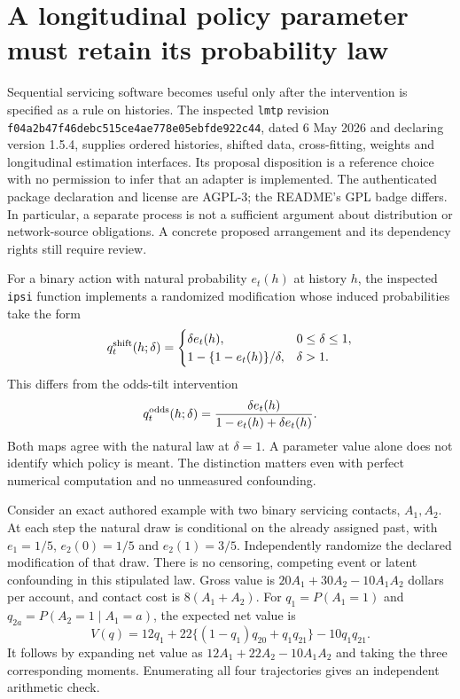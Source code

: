 \section{A longitudinal policy parameter must retain its probability law}
\label{exec23:lmtp-scope}

Sequential servicing software becomes useful only after the intervention is
specified as a rule on histories. The inspected \texttt{lmtp} revision
\texttt{f04a2b47f46debc515ce4ae778e05ebfde922c44}, dated 6 May 2026 and
declaring version 1.5.4, supplies ordered histories, shifted data, cross-fitting,
weights and longitudinal estimation interfaces. Its proposal disposition is a
reference choice with no permission to infer that an adapter is implemented.
The authenticated package declaration and license are AGPL-3; the README's
GPL badge differs. In particular, a separate process is not a sufficient
argument about distribution or network-source obligations. A concrete proposed
arrangement and its dependency rights still require review.
\citep{exec22_lmtp_reuse}

For a binary action with natural probability $e_t(h)$ at history $h$, the
inspected \texttt{ipsi} function implements a randomized modification whose
induced probabilities take the form
\begin{equation}
 q^{\rm shift}_t(h;\delta)=
 \begin{cases}
 \delta e_t(h),&0\leq\delta\leq1,\\
 1-\{1-e_t(h)\}/\delta,&\delta>1.
 \end{cases}
 \label{exec23:lmtp-shift}
\end{equation}
This differs from the odds-tilt intervention
\begin{equation}
 q^{\rm odds}_t(h;\delta)=
 \frac{\delta e_t(h)}{1-e_t(h)+\delta e_t(h)}.
 \label{exec23:lmtp-odds}
\end{equation}
Both maps agree with the natural law at $\delta=1$. A parameter value alone
does not identify which policy is meant. The distinction matters even with
perfect numerical computation and no unmeasured confounding.
\citep{exec22_lmtp_reuse,exec23_policy_reference}

Consider an exact authored example with two binary servicing contacts,
$A_1,A_2$. At each step the natural draw is conditional on the already assigned
past, with $e_1=1/5$, $e_2(0)=1/5$ and $e_2(1)=3/5$. Independently randomize
the declared modification of that draw. There is no censoring, competing event
or latent confounding in this stipulated law. Gross value is
$20A_1+30A_2-10A_1A_2$ dollars per account, and contact cost is
$8(A_1+A_2)$. For $q_1=P(A_1=1)$ and $q_{2a}=P(A_2=1\mid A_1=a)$,
the expected net value is
\begin{equation}
 V(q)=12q_1+22\{(1-q_1)q_{20}+q_1q_{21}\}-10q_1q_{21}.
 \label{exec23:lmtp-value}
\end{equation}
It follows by expanding net value as $12A_1+22A_2-10A_1A_2$ and taking
the three corresponding moments. Enumerating all four trajectories gives an
independent arithmetic check.\citep{exec23_policy_reference}

